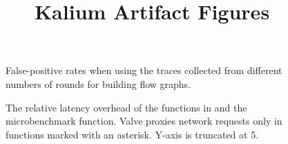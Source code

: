 \documentclass{article}[IEEE]
\title{Kalium Artifact Figures}
\begin{document}
\maketitle


\begin{figure}[t]
\begin{center}

\end{center}
\caption{False-positive rates when using the traces collected from different numbers of rounds  
for building flow graphs.}
\label{fig:flowerror}
\end{figure}

\begin{figure*}[t]
	\begin{center}
		
	\end{center}
	\caption{The relative latency overhead of the functions in \helloapp and the microbenchmark function. Valve proxies network requests only in functions marked with an asterisk. Y-axis is truncated at 5.}
	\label{fig:restrel}
\end{figure*}
\end{document}
